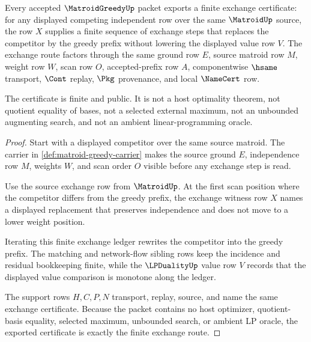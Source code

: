 \begin{theorem}
\label{thm:matroid-greedy-exchange-certificate}
Every accepted $\MatroidGreedyUp$ packet exports a finite exchange certificate: for any displayed competing independent row over the same $\MatroidUp$ source, the row $X$ supplies a finite sequence of exchange steps that replaces the competitor by the greedy prefix without lowering the displayed value row $V$. The exchange route factors through the same ground row $E$, source matroid row $M$, weight row $W$, scan row $O$, accepted-prefix row $A$, componentwise $\hsame$ transport, $\Cont$ replay, $\Pkg$ provenance, and local $\NameCert$ row.

The certificate is finite and public. It is not a host optimality theorem, not quotient equality of bases, not a selected external maximum, not an unbounded augmenting search, and not an ambient linear-programming oracle.
\end{theorem}
\begin{proof}
Start with a displayed competitor over the same source matroid. The carrier in \autoref{def:matroid-greedy-carrier} makes the source ground $E$, independence row $M$, weights $W$, and scan order $O$ visible before any exchange step is read.

Use the source exchange row from $\MatroidUp$. At the first scan position where the competitor differs from the greedy prefix, the exchange witness row $X$ names a displayed replacement that preserves independence and does not move to a lower weight position.

Iterating this finite exchange ledger rewrites the competitor into the greedy prefix. The matching and network-flow sibling rows keep the incidence and residual bookkeeping finite, while the $\LPDualityUp$ value row $V$ records that the displayed value comparison is monotone along the ledger.

The support rows $H,C,P,N$ transport, replay, source, and name the same exchange certificate. Because the packet contains no host optimizer, quotient-basis equality, selected maximum, unbounded search, or ambient LP oracle, the exported certificate is exactly the finite exchange route.
\end{proof}


